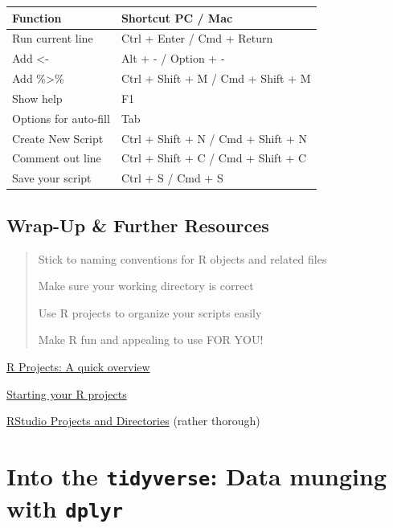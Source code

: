 \documentclass[
]{book}
\begin{document}
\begin{longtable}[]{@{}ll@{}}
\toprule\noalign{}
Function & Shortcut PC / Mac \\
\midrule\noalign{}
\endhead
\bottomrule\noalign{}
\endlastfoot
Run current line & Ctrl + Enter / Cmd + Return \\
Add \textless- & Alt + - / Option + - \\
Add \%\textgreater\% & Ctrl + Shift + M / Cmd + Shift + M \\
Show help & F1 \\
Options for auto-fill & Tab \\
Create New Script & Ctrl + Shift + N / Cmd + Shift + N \\
Comment out line & Ctrl + Shift + C / Cmd + Shift + C \\
Save your script & Ctrl + S / Cmd + S \\
\end{longtable}

\section{Wrap-Up \& Further Resources}\label{wrap-up-further-resources-1}

\begin{quote}
Stick to naming conventions for R objects and related files

Make sure your working directory is correct

Use R projects to organize your scripts easily

Make R fun and appealing to use FOR YOU!
\end{quote}

\href{https://thedavidchen.github.io/post/rstudio-why-use-projects/}{R Projects: A quick overview}

\href{https://bookdown.org/daniel_dauber_io/r4np_book/starting-your-r-projects.html}{Starting your R projects}

\href{https://martinctc.github.io/blog/rstudio-projects-and-working-directories-a-beginner's-guide/}{RStudio Projects and Directories} (rather thorough)

\chapter{\texorpdfstring{Into the \texttt{tidyverse}: Data munging with \texttt{dplyr}}{Into the tidyverse: Data munging with dplyr}}\label{into-the-tidyverse-data-munging-with-dplyr}
\end{document}
